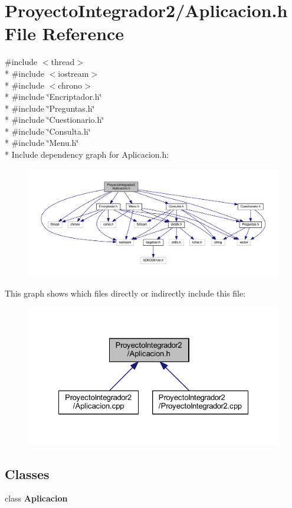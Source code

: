 \section{Proyecto\-Integrador2/\-Aplicacion.h File Reference}
\label{_aplicacion_8h}
{\ttfamily \#include $<$thread$>$}\\*
{\ttfamily \#include $<$iostream$>$}\\*
{\ttfamily \#include $<$chrono$>$}\\*
{\ttfamily \#include \char`\"{}Encriptador.\-h\char`\"{}}\\*
{\ttfamily \#include \char`\"{}Preguntas.\-h\char`\"{}}\\*
{\ttfamily \#include \char`\"{}Cuestionario.\-h\char`\"{}}\\*
{\ttfamily \#include \char`\"{}Consulta.\-h\char`\"{}}\\*
{\ttfamily \#include \char`\"{}Menu.\-h\char`\"{}}\\*
Include dependency graph for Aplicacion.\-h\-:\nopagebreak
\begin{figure}[H]
\begin{center}
\leavevmode
\includegraphics[width=350pt]{_aplicacion_8h__incl}
\end{center}
\end{figure}
This graph shows which files directly or indirectly include this file\-:\nopagebreak
\begin{figure}[H]
\begin{center}
\leavevmode
\includegraphics[width=327pt]{_aplicacion_8h__dep__incl}
\end{center}
\end{figure}
\subsection*{Classes}
\begin{DoxyCompactItemize}
\item 
class {\bf Aplicacion}
\end{DoxyCompactItemize}
